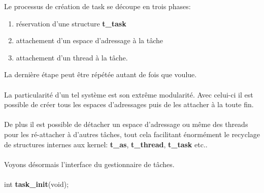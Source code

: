 \documentclass[10pt,a4wide]{article}
\begin{document}
Le processus de cr\'eation de task se d\'ecoupe en trois phases:

\begin{enumerate}

\item r\'eservation d'une structure \textbf{t\_task}

\item attachement d'un espace d'adressage \`a la t\^ache

\item attachement d'un thread \`a la t\^ache.

\end{enumerate}

La derni\`ere \'etape peut \^etre r\'ep\'et\'ee autant de fois que voulue.

\paragraph{}

La particularit\'e d'un tel syst\`eme est son extr\^eme modularit\'e. Avec
celui-ci il est possible de cr\'eer tous les espaces d'adressages puis
de les attacher \`a la toute fin.

\paragraph{}

De plus il est possible de d\'etacher un espace d'adressage ou m\^eme
des threads pour les r\'e-attacher \`a d'autres t\^aches, tout cela
facilitant \'enorm\'ement le recyclage de structures internes aux
kernel: \textbf{t\_as}, \textbf{t\_thread}, \textbf{t\_task} etc..

\paragraph{}

Voyons d\'esormais l'interface du gestionnaire de t\^aches.

\paragraph{}

\hspace{1.5cm}int \textbf{task\_init}(void);

\paragraph{}
\end{document}
